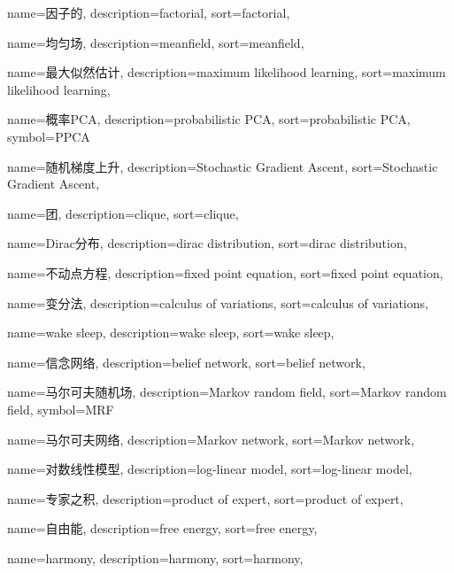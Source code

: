 {
  name=因子的,
  description={factorial},
  sort={factorial},
}

{
  name=均匀场,
  description={meanfield},
  sort={meanfield},
}

{
  name=最大似然估计,
  description={maximum likelihood learning},
  sort={maximum likelihood learning},
}

{
  name=概率PCA,
  description={probabilistic PCA},
  sort={probabilistic PCA},
  symbol={PPCA}
}

{
  name=随机梯度上升,
  description={Stochastic Gradient Ascent},
  sort={Stochastic Gradient Ascent},
}

{
  name=团,
  description={clique},
  sort={clique},
}

{
  name=Dirac分布,
  description={dirac distribution},
  sort={dirac distribution},
}

{
  name=不动点方程,
  description={fixed point equation},
  sort={fixed point equation},
}

{
  name=变分法,
  description={calculus of variations},
  sort={calculus of variations},
}

{
  name=wake sleep,
  description={wake sleep},
  sort={wake sleep},
}

{
  name=信念网络,
  description={belief network},
  sort={belief network},
}

{
  name=马尔可夫随机场,
  description={Markov random field},
  sort={Markov random field},
  symbol={MRF}
}

{
  name=马尔可夫网络,
  description={Markov network},
  sort={Markov network},
}

{
  name=对数线性模型,
  description={log-linear model},
  sort={log-linear model},
}

{
  name=专家之积,
  description={product of expert},
  sort={product of expert},
}

{
  name=自由能,
  description={free energy},
  sort={free energy},
}

{
  name=harmony,
  description={harmony},
  sort={harmony},
}


